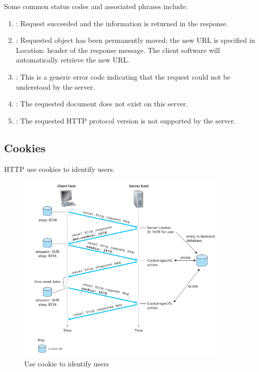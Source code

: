 Some common status codes and associated phrases include:
\begin{enumerate}
    \item {}: Request succeeded and the information is returned in the response.
    \item {}: Requested object has been permanently moved;
          the new URL is specified in Location: header of the response message. The
          client software will automatically retrieve the new URL.
    \item {}: This is a generic error code indicating that the request
          could not be understood by the server.
    \item {}: The requested document does not exist on this server.
    \item {}: The requested HTTP protocol
          version is not supported by the server.
\end{enumerate}


\subsection{Cookies}
HTTP use cookies to identify users.

\begin{figure}[!h]
    \centering
    \includegraphics[width=0.9\textwidth]{chapters/chapter2/UserState_cookie.png}
    \caption{Use cookie to identify users}
    \label{c2_cookies}
\end{figure}

